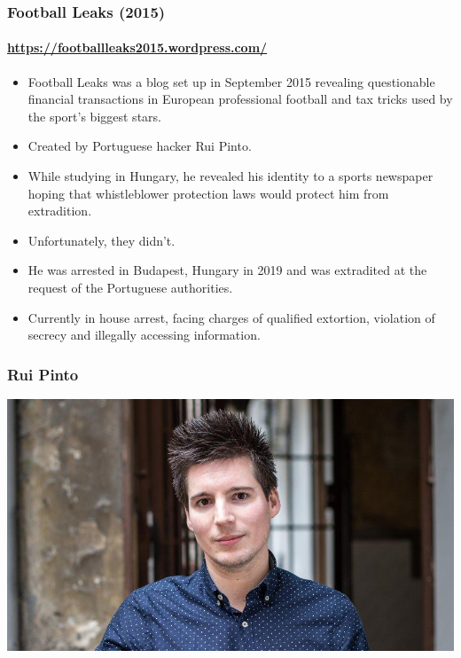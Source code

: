 \documentclass[aspectratio=169,usenames,dvipsnames]{beamer}
\begin{document}
\begin{frame}
  \frametitle{Football Leaks (2015)}
  \framesubtitle{\url{https://footballleaks2015.wordpress.com/}}

  \begin{itemize}[<+->]
    \item Football Leaks was a blog set up in September 2015 revealing
      questionable financial transactions in European professional football
      and tax tricks used by the sport's biggest stars.
    \item Created by Portuguese hacker Rui Pinto.
    \item While studying in Hungary, he revealed his identity to a sports
      newspaper hoping that whistleblower protection laws would protect him
      from extradition.
    \item Unfortunately, they didn't.
    \item He was arrested in Budapest, Hungary in 2019 and was extradited at
      the request of the Portuguese authorities.
    \item Currently in house arrest, facing charges of qualified extortion,
      violation of secrecy and illegally accessing information.
  \end{itemize}

\end{frame}

\begin{frame}[c]
  \frametitle{Rui Pinto}

  \centering
  \includegraphics[width=.49\textwidth,height=.49\textheight,keepaspectratio]{img/rui_pinto.jpg}

\end{frame}
\end{document}
